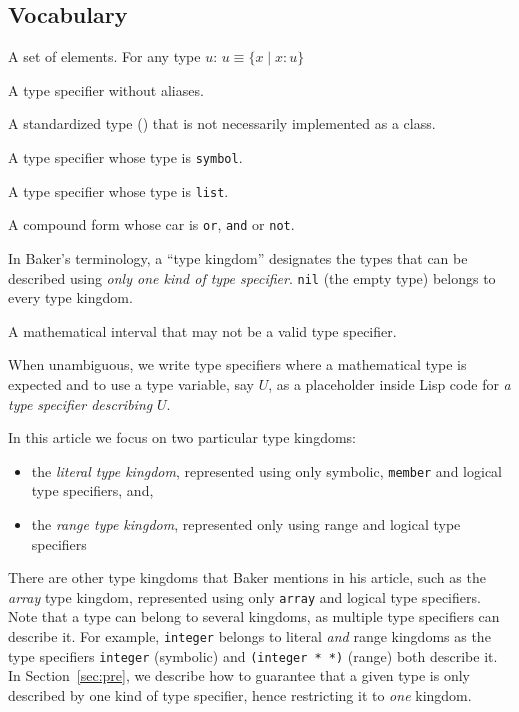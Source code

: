 \documentclass[format=sigconf]{acmart}
\newcommand\code[2][\small]{\sloppy\texttt{#1#2}}
\theoremstyle{definition}
\begin{document}
\subsection{Vocabulary}
\begin{description}[leftmargin=8em,style=nextline]
  \item[type] A set of elements. For any type $u$: $u \equiv \{x \mid x\!:\!u\}$
  \item[canonical t.s.] A type specifier without aliases.
  \item[primitive type] A standardized type
    (\cite{bib:ansi.94.cl.type-specifiers}) that is not necessarily implemented
    as a class.
  \item[symbolic form] A type specifier whose type is \code{symbol}.
  \item[compound form] A type specifier whose type is \code{list}.
  \item[logical form] A compound form whose car is \code{or}, \code{and} or \code{not}.
  \item[kingdom] In Baker's terminology, a ``type kingdom'' designates the types
    that can be described using \emph{only one kind of type specifier}.
    \code{nil} (the empty type) belongs to every type kingdom.
  \item[interval] A mathematical interval that may not be a valid type specifier.
  \item[type $\approx$ t.s.] When unambiguous, we write type specifiers where a
    mathematical type is expected and to use a type variable, say $U$, as a
    placeholder inside Lisp code for \emph{a type specifier describing} $U$.
\end{description}

In this article we focus on two particular type kingdoms:
\begin{itemize}
\item the \emph{literal type kingdom}, represented using only
  symbolic, \code{member} and logical type specifiers, and,
\item the \emph{range type kingdom}, represented only using
  range and logical type specifiers
\end{itemize}

There are other type kingdoms that Baker mentions in his article, such as the
\emph{array} type kingdom, represented using only \code{array} and logical type
specifiers. Note that a type can belong to several kingdoms, as multiple type
specifiers can describe it. For example, \code{integer} belongs to literal
\emph{and} range kingdoms as the type specifiers \code{integer} (symbolic) and
\code{(integer * *)} (range) both describe it. In Section~\ref{sec:pre}, we
describe how to guarantee that a given type is only described by one kind of
type specifier, hence restricting it to \emph{one} kingdom.
\end{document}
